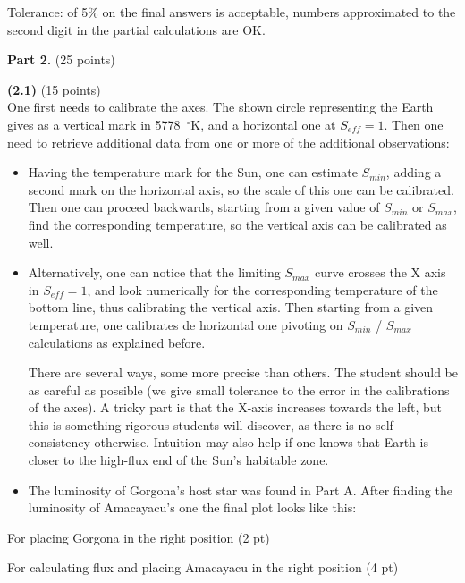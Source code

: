 Tolerance: of 5\% on the final answers is acceptable, numbers approximated to
the second digit in the partial calculations are OK.


\medskip
\noindent\textbf{Part 2.} \hfill(25 points)

\noindent\textbf{(2.1)} \hfill(15 points)\\
One first needs to calibrate the axes. The shown circle representing the Earth
gives as a vertical mark in 5778~$^\circ$K,
and a horizontal one at $S_{eff} = 1$. Then one need to retrieve additional
data from one or more of the additional observations:

\begin{itemize}
\item Having the temperature mark for the Sun, one can estimate $S_{min}$,
adding a second mark on the horizontal axis, so the scale of this one can be
calibrated. Then one can proceed backwards, starting from a given value of
$S_{min}$ or $S_{max}$, find the corresponding temperature, so the vertical
axis can be calibrated as well.
\item Alternatively, one can notice that the limiting $S_{max}$ curve crosses
the X axis in $S_{eff} = 1$, and look numerically for the corresponding
temperature of the bottom line, thus calibrating the vertical axis. Then
starting from a given temperature, one calibrates de
horizontal one pivoting on $S_{min}$ / $S_{max}$ calculations as explained
before.

There are several ways, some more precise than others. The student should be
as careful as possible (we give small tolerance to the error in the
calibrations of the axes). A tricky part is that the X-axis increases towards
the left, but this is something rigorous students will discover, as there is
no self-consistency otherwise. Intuition may also help if one knows that
Earth is closer to the high-flux end of the Sun's habitable zone.
\item The luminosity of Gorgona's host star was found in Part A. After
finding the luminosity of Amacayacu's one the final plot looks like this:
\end{itemize}

For placing Gorgona in the right position \hfill(2 pt)


For calculating flux and placing Amacayacu in the right position \hfill(4 pt)

